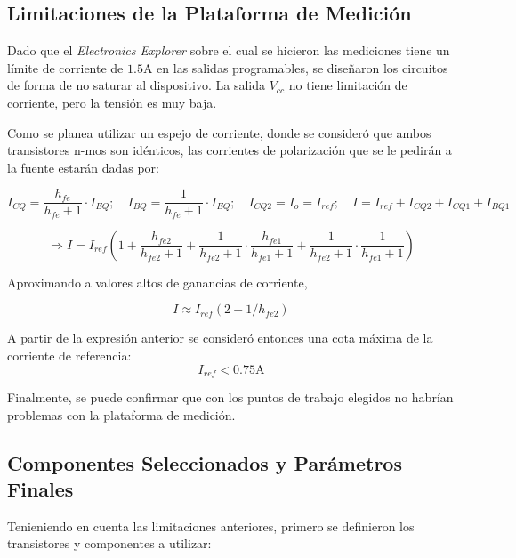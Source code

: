 \subsection{Limitaciones de la Plataforma de Medición} \label{sec:EE_limits}

Dado que el \textit{Electronics Explorer} sobre el cual se hicieron las mediciones tiene un límite de corriente de $1.5 \si{\ampere}$ en las salidas programables, se diseñaron los circuitos de forma de no saturar al dispositivo. La salida $V_{cc}$ no tiene limitación de corriente, pero la tensión es muy baja.

Como se planea utilizar un espejo de corriente, donde se consideró que ambos transistores n-mos son idénticos, las corrientes de polarización que se le pedirán a la fuente estarán dadas por:

\begin{equation*}
    I_{CQ} = \frac{h_{fe}}{h_{fe}+1} \cdot I_{EQ}; \quad I_{BQ} = \frac{1}{h_{fe}+1} \cdot I_{EQ}; \quad
    I_{CQ2} = I_o = I_{ref}; \quad I = I_{ref} + I_{CQ2} + I_{CQ1} + I_{BQ1}
\end{equation*}

\begin{equation}
    \Rightarrow I = I_{ref} \left(1 + \frac{h_{fe2}}{h_{fe2}+1} + \frac{1}{h_{fe2}+1}\cdot\frac{h_{fe1}}{h_{fe1}+1}+\frac{1}{h_{fe2}+1}\cdot\frac{1}{h_{fe1}+1}\right)
\end{equation}

Aproximando a valores altos de ganancias de corriente,

\begin{equation}
    I \approx I_{ref}\left(2+1/h_{fe2}\right)
\end{equation}

A partir de la expresión anterior se consideró entonces una cota máxima de la corriente de referencia:
\begin{equation}
    I_{ref} < 0.75 \si{\ampere}
    \label{eq:Iref}
\end{equation}

Finalmente, se puede confirmar que con los puntos de trabajo elegidos no habrían problemas con la plataforma de medición.

\subsection{Componentes Seleccionados y Parámetros Finales}

Tenieniendo en cuenta las limitaciones anteriores, primero se definieron los transistores y componentes a utilizar:


